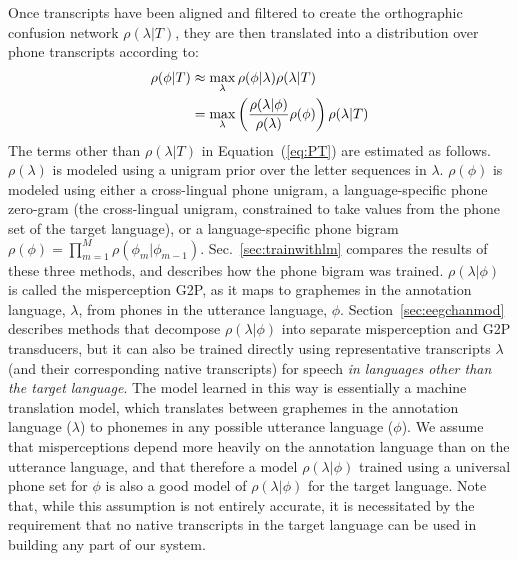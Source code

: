 Once transcripts have
been aligned and filtered to create the orthographic confusion network
$\rho(\lambda|T)$, they are then translated into a distribution over
phone transcripts according to:
\begin{align}
  \rho(\phi|T) 
  &\approx \max_{\lambda}  \rho(\phi|\lambda) \rho(\lambda|T) \notag \\
  &= \max_{\lambda}  \left(\frac{\rho(\lambda|\phi)}{\rho(\lambda)}
  \rho(\phi)\right) \rho(\lambda|T) 
\label{eq:PT}
\end{align}
The terms other than $\rho(\lambda|T)$ in Equation~(\ref{eq:PT}) are
estimated as follows.  $\rho(\lambda)$ is modeled using a unigram
prior over the letter sequences in $\lambda$.  $\rho(\phi)$ is modeled
using {\color{blue} either a cross-lingual phone unigram, a
  language-specific phone zero-gram (the cross-lingual unigram,
  constrained to take values from the phone set of the target
  language), or a language-specific phone bigram
  $\rho(\phi)=\prod_{m=1}^M \rho(\phi_m|\phi_{m-1})$.
  Sec.~\ref{sec:trainwithlm} compares the results of these three
  methods, and describes how the phone bigram was trained.}
$\rho(\lambda|\phi)$ is called the misperception G2P, as it maps to
graphemes in the annotation language, $\lambda$, from phones in the
utterance language, $\phi$.  Section~\ref{sec:eegchanmod} describes
methods that decompose $\rho(\lambda|\phi)$ into separate
misperception and G2P transducers, but it can also be trained directly
using
representative transcripts $\lambda$ (and their
corresponding native transcripts) for speech {\em in languages other
  than the target language}.
{\color{blue} The model learned in this way is essentially
  a machine translation model, which translates between graphemes in
  the annotation language ($\lambda$) to phonemes in any possible
  utterance language ($\phi$).}
We assume that misperceptions depend more
heavily on the annotation language than on the utterance language, and
that therefore a model $\rho(\lambda|\phi)$ trained using a universal
phone set for $\phi$ is also a good model of $\rho(\lambda|\phi)$ for
the target language. Note that, while this assumption is not entirely
accurate, it is necessitated by the requirement that no native
transcripts in the target language can be used in building any part
of our system.

